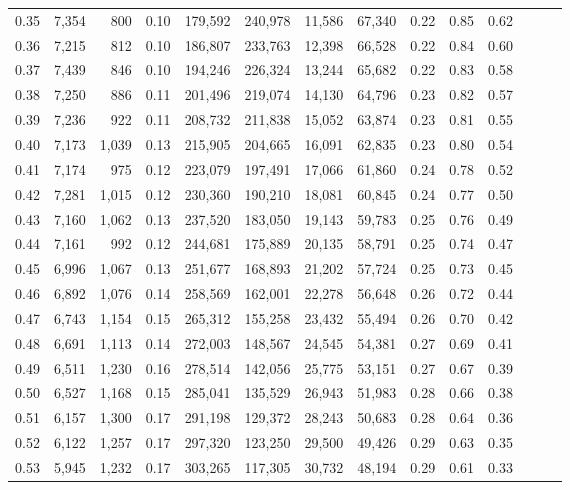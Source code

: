 \begin{tabular}{rrrrrrrrrrrrrr}
0.35 &  7,354 &    800 &  0.10 &  179,592 &  240,978 &  11,586 &  67,340 &  0.22 &  0.85 &      0.62 \\
0.36 &  7,215 &    812 &  0.10 &  186,807 &  233,763 &  12,398 &  66,528 &  0.22 &  0.84 &      0.60 \\
0.37 &  7,439 &    846 &  0.10 &  194,246 &  226,324 &  13,244 &  65,682 &  0.22 &  0.83 &      0.58 \\
0.38 &  7,250 &    886 &  0.11 &  201,496 &  219,074 &  14,130 &  64,796 &  0.23 &  0.82 &      0.57 \\
0.39 &  7,236 &    922 &  0.11 &  208,732 &  211,838 &  15,052 &  63,874 &  0.23 &  0.81 &      0.55 \\
0.40 &  7,173 &  1,039 &  0.13 &  215,905 &  204,665 &  16,091 &  62,835 &  0.23 &  0.80 &      0.54 \\
0.41 &  7,174 &    975 &  0.12 &  223,079 &  197,491 &  17,066 &  61,860 &  0.24 &  0.78 &      0.52 \\
0.42 &  7,281 &  1,015 &  0.12 &  230,360 &  190,210 &  18,081 &  60,845 &  0.24 &  0.77 &      0.50 \\
0.43 &  7,160 &  1,062 &  0.13 &  237,520 &  183,050 &  19,143 &  59,783 &  0.25 &  0.76 &      0.49 \\
0.44 &  7,161 &    992 &  0.12 &  244,681 &  175,889 &  20,135 &  58,791 &  0.25 &  0.74 &      0.47 \\
0.45 &  6,996 &  1,067 &  0.13 &  251,677 &  168,893 &  21,202 &  57,724 &  0.25 &  0.73 &      0.45 \\
0.46 &  6,892 &  1,076 &  0.14 &  258,569 &  162,001 &  22,278 &  56,648 &  0.26 &  0.72 &      0.44 \\
0.47 &  6,743 &  1,154 &  0.15 &  265,312 &  155,258 &  23,432 &  55,494 &  0.26 &  0.70 &      0.42 \\
0.48 &  6,691 &  1,113 &  0.14 &  272,003 &  148,567 &  24,545 &  54,381 &  0.27 &  0.69 &      0.41 \\
0.49 &  6,511 &  1,230 &  0.16 &  278,514 &  142,056 &  25,775 &  53,151 &  0.27 &  0.67 &      0.39 \\
0.50 &  6,527 &  1,168 &  0.15 &  285,041 &  135,529 &  26,943 &  51,983 &  0.28 &  0.66 &      0.38 \\
0.51 &  6,157 &  1,300 &  0.17 &  291,198 &  129,372 &  28,243 &  50,683 &  0.28 &  0.64 &      0.36 \\
0.52 &  6,122 &  1,257 &  0.17 &  297,320 &  123,250 &  29,500 &  49,426 &  0.29 &  0.63 &      0.35 \\
0.53 &  5,945 &  1,232 &  0.17 &  303,265 &  117,305 &  30,732 &  48,194 &  0.29 &  0.61 &      0.33 \\

\end{tabular}
